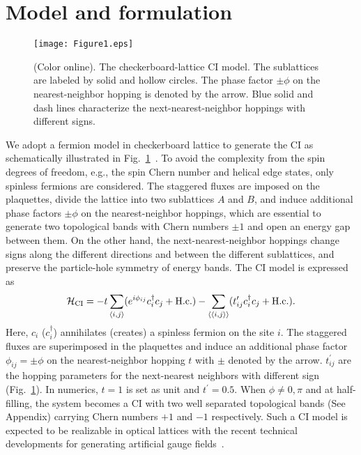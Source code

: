 \documentclass[12pt]{iopart}
\begin{document}
\section{Model and formulation}
\label{Sec.2}
\begin{figure}[!htb]
\centering
\texttt{[image: Figure1.eps]}
\caption{(Color online). The checkerboard-lattice CI model. The sublattices are labeled by solid and hollow circles. The phase factor $\pm\phi$ on the nearest-neighbor hopping is denoted by the arrow. Blue solid and dash lines characterize the next-nearest-neighbor hoppings with different signs.}\label{f.1}
\end{figure}
We adopt a fermion model in checkerboard lattice to generate the CI as schematically illustrated in Fig.~\ref{f.1}~\cite{SunK-PRL2009,SunK-PRL2011,Liu-SR2016}. To avoid the complexity from the spin degrees of freedom, e.g., the spin Chern number and helical edge states, only spinless fermions are considered. The staggered fluxes are imposed on the plaquettes, divide the lattice into two sublattices $A$ and $B$, and induce additional phase factors $\pm\phi$ on the nearest-neighbor hoppings, which are essential to generate two topological bands with Chern numbers $\pm1$ and open an energy gap between them. On the other hand, the next-nearest-neighbor hoppings change signs along the different directions and between the different sublattices, and preserve the particle-hole symmetry of energy bands. The CI model is expressed as
\begin{equation}
\mathcal{H}_{\rm CI}=-t\sum_{\langle i,j\rangle}(e^{i\phi_{ij}}c_{i}^{\dagger}c_{j}+ {\rm H.c.})-\sum_{\langle\langle i,j\rangle\rangle}(t^{\prime}_{ij}c_{i}^{\dagger}c_{j}+ {\rm H.c.}).
\label{E.1}
\end{equation}
Here, $c_{i}$ ($c_{i}^{\dagger}$) annihilates (creates) a spinless fermion on the site $i$. The staggered fluxes are superimposed in the plaquettes and induce an additional phase factor $\phi_{ij}=\pm\phi$ on the nearest-neighbor hopping $t$ with $\pm$ denoted by the arrow. $t^{\prime}_{ij}$ are the hopping parameters for the next-nearest neighbors with different sign (Fig.~\ref{f.1}). In numerics, $t=1$ is set as unit and $t^{\prime}=0.5$. When $\phi\neq0,\pi$ and at half-filling, the system becomes a CI with two well separated topological bands (See Appendix) carrying Chern numbers $+1$ and $-1$ respectively. Such a CI model is expected to be realizable in optical lattices with the recent technical developments for generating artificial gauge fields~\cite{Dalibard-RMP2011,Aidelsburger-PRL2011,Jimenez-Garcia-PRL2012,Struck-PRL2012}.
\end{document}
